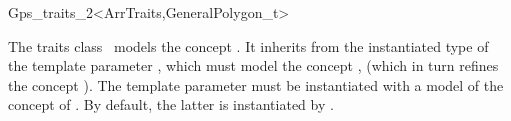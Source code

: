 \ccRefPageBegin

\begin{ccRefClass}{Gps_traits_2<ArrTraits,GeneralPolygon_t>}

\ccThreeToTwo

\ccDefinition
The traits class \ccRefName\ models the concept 
. It inherits from the instantiated 
type of the template parameter , which must model the 
concept , (which in turn refines
the concept ). The template parameter
 must be instantiated with a model of the concept
of . By default, the latter is instantiated by
.

 
\ccIsModel

\end{ccRefClass}
\ccRefPageEnd
